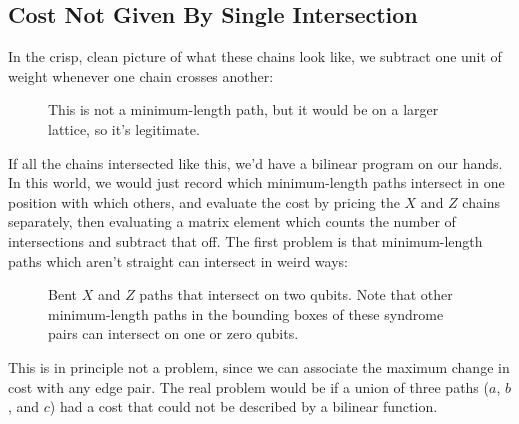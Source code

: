 \documentclass[a4paper, english]{scrartcl}
\begin{document}
\subsection{Cost Not Given By Single Intersection}
In the crisp, clean picture of what these chains look like, we subtract one unit of weight whenever one chain crosses another:
\begin{figure}
[!h]
\centering
{}
\caption{This is not a minimum-length path, but it would be on a larger lattice, so it's legitimate.}
\end{figure}

If all the chains intersected like this, we'd have a bilinear program on our hands. 
In this world, we would just record which minimum-length paths intersect in one position with which others, and evaluate the cost by pricing the $X$ and $Z$ chains separately, then evaluating a matrix element which counts the number of intersections and subtract that off. 
The first problem is that minimum-length paths which aren't straight can intersect in weird ways:
\begin{figure}
[!h]
\centering
{}
\caption{Bent $X$ and $Z$ paths that intersect on two qubits. Note that other minimum-length paths in the bounding boxes of these syndrome pairs can intersect on one or zero qubits.}
\end{figure}
This is in principle not a problem, since we can associate the maximum change in cost with any edge pair. 
The real problem would be if a union of three paths ($a$, $b$, and $c$) had a cost that could not be described by a bilinear function. 
\end{document}

